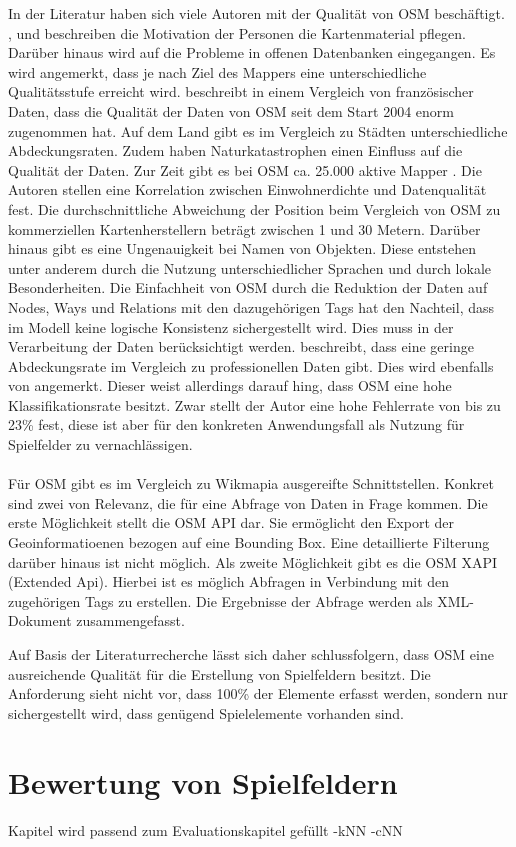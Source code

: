 In der Literatur haben sich viele Autoren mit der Qualität von OSM beschäftigt.
\textcite{Haklay.2010}, \textcite{Flanagin.2008} und \textcite{Goodchild.2007} beschreiben die Motivation der Personen die Kartenmaterial pflegen. Darüber hinaus wird auf die Probleme in offenen Datenbanken eingegangen. Es wird angemerkt, dass je nach Ziel des Mappers eine unterschiedliche Qualitätsstufe erreicht wird.
\textcite{Girres.2010} beschreibt in einem Vergleich von französischer Daten, dass die Qualität der Daten von OSM seit dem Start 2004 enorm zugenommen hat. Auf dem Land gibt es im Vergleich zu Städten unterschiedliche Abdeckungsraten. Zudem haben Naturkatastrophen einen Einfluss auf die Qualität der Daten.\cite{Zook.2010}
Zur Zeit gibt es bei OSM ca. 25.000 aktive Mapper \cite{OSM.2013}. Die Autoren stellen eine Korrelation zwischen Einwohnerdichte und Datenqualität fest.
Die durchschnittliche Abweichung der Position beim Vergleich von OSM zu kommerziellen Kartenherstellern beträgt zwischen 1 und 30 Metern.
Darüber hinaus gibt es eine Ungenauigkeit bei Namen von Objekten. Diese entstehen unter anderem durch die Nutzung unterschiedlicher Sprachen und durch lokale Besonderheiten.
Die Einfachheit von OSM durch die Reduktion der Daten auf Nodes, Ways und Relations mit den dazugehörigen Tags hat den Nachteil, dass im Modell keine logische Konsistenz sichergestellt wird. Dies muss in der Verarbeitung der Daten berücksichtigt werden.
\textcite{Hecht.2013} beschreibt, dass eine geringe Abdeckungsrate im Vergleich zu professionellen Daten gibt. Dies wird ebenfalls von \textcite{Pfoser.2013} angemerkt. Dieser weist allerdings darauf hing, dass OSM eine hohe Klassifikationsrate besitzt. Zwar stellt der Autor eine hohe Fehlerrate von bis zu 23\% fest, diese ist aber für den konkreten Anwendungsfall als Nutzung für Spielfelder  zu vernachlässigen.
\\\\
Für OSM gibt es im Vergleich zu Wikmapia ausgereifte Schnittstellen. Konkret sind zwei von Relevanz, die für eine Abfrage von Daten in Frage kommen.
Die erste Möglichkeit stellt die OSM API dar. Sie ermöglicht den Export der Geoinformatioenen bezogen auf eine Bounding Box. Eine detaillierte Filterung darüber hinaus ist nicht möglich.
Als zweite Möglichkeit gibt es die OSM XAPI (Extended Api). Hierbei ist es möglich Abfragen in Verbindung mit den zugehörigen Tags zu erstellen.\cite{Meyer.2013} Die Ergebnisse der Abfrage werden als XML-Dokument zusammengefasst.

Auf Basis der Literaturrecherche lässt sich daher schlussfolgern, dass OSM eine ausreichende Qualität für die Erstellung von Spielfeldern besitzt. Die Anforderung sieht nicht vor, dass 100\% der Elemente erfasst werden, sondern nur sichergestellt wird, dass genügend Spielelemente vorhanden sind.



\section{Bewertung von Spielfeldern}
\label{ch3:s:geostatistik}

Kapitel wird passend zum Evaluationskapitel gefüllt
-kNN
-cNN
